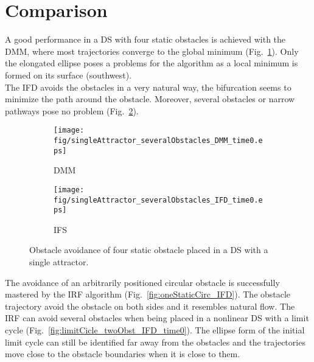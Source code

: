 \section{Comparison}
A good performance in a DS with four static obstacles is achieved with the DMM, where most trajectories converge to the global minimum (Fig.~\ref{fig:singleAttractor_severalObstacles_DMM_time0}). Only the elongated ellipse poses a problems for the algorithm as a local minimum is formed on its surface (southwest).\\
The IFD avoids the obstacles in a very natural way, the bifurcation seems to minimize the path around the obstacle. Moreover, several obstacles or narrow pathways pose no problem (Fig.~\ref{fig:singleAttractor_severalObstacles_IFD_time0}).
\begin{figure}[tb]\centering
\begin{subfigure}{.48\columnwidth} %
\centering
\texttt{[image: fig/singleAttractor\_severalObstacles\_DMM\_time0.eps]}
\caption{DMM}
\label{fig:singleAttractor_severalObstacles_DMM_time0}
\end{subfigure}%
\begin{subfigure}{.48\columnwidth} %
\centering
\texttt{[image: fig/singleAttractor\_severalObstacles\_IFD\_time0.eps]}
\caption{IFS}
\label{fig:singleAttractor_severalObstacles_IFD_time0}
\end{subfigure}
\caption{Obstacle avoidance of four static obstacle placed in a DS with a single attractor.}
\label{fig:singleAttractor_severalObstacles_time}
\end{figure}

The avoidance of an arbitrarily positioned circular obstacle is successfully mastered by the IRF algorithm (Fig.~\ref{fig:oneStaticCirc_IFD}). The obstacle trajectory avoid the obstacle on both sides and it resembles natural flow.
The IRF can avoid several obstacles when being placed in a nonlinear DS with a limit cycle  (Fig.~\ref{fig:limitCicle_twoObst_IFD_time0}). The ellipse form of the initial limit cycle can still be identified far away from the obstacles and the trajectories move close to the obstacle boundaries when it is close to them.

